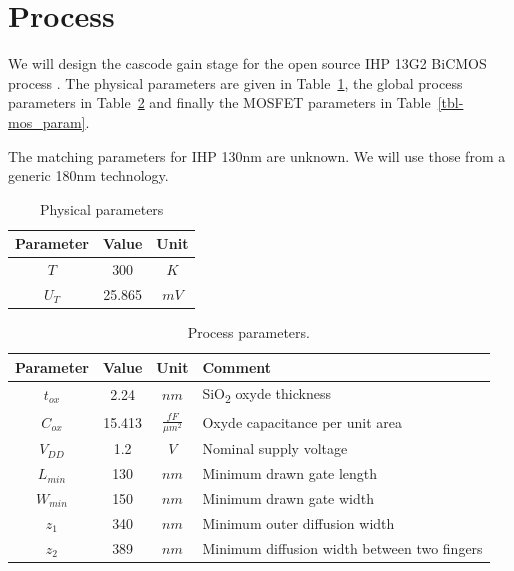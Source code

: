 \documentclass[
  a4paper,
  DIV=11,
  numbers=noendperiod]{scrreprt}
\begin{document}
\section{Process}\label{process}

We will design the cascode gain stage for the open source IHP 13G2
BiCMOS process . The physical
parameters are given in Table~\ref{tbl-physics_param}, the global
process parameters in Table~\ref{tbl-process_param} and finally the
MOSFET parameters in Table~\ref{tbl-mos_param}.

\begin{tcolorbox}[enhanced jigsaw, bottomrule=.15mm, colback=white, leftrule=.75mm, toprule=.15mm, opacitybacktitle=0.6, colbacktitle=quarto-callout-warning-color!10!white, left=2mm, colframe=quarto-callout-warning-color-frame, coltitle=black, bottomtitle=1mm, arc=.35mm, toptitle=1mm, titlerule=0mm, title=\textcolor{quarto-callout-warning-color}{\faExclamationTriangle}\hspace{0.5em}{Warning}, breakable, opacityback=0, rightrule=.15mm]

The matching parameters for IHP 130nm are unknown. We will use those
from a generic 180nm technology.

\end{tcolorbox}

\begin{longtable}[]{@{}ccc@{}}

\caption{\label{tbl-physics_param}Physical parameters}

\tabularnewline

\toprule\noalign{}
Parameter & Value & Unit \\
\midrule\noalign{}
\endhead
\bottomrule\noalign{}
\endlastfoot
\(T\) & 300 & \(K\) \\
\(U_T\) & 25.865 & \(mV\) \\

\end{longtable}

\begin{longtable}[]{@{}cccl@{}}

\caption{\label{tbl-process_param}Process parameters.}

\tabularnewline

\toprule\noalign{}
Parameter & Value & Unit & Comment \\
\midrule\noalign{}
\endhead
\bottomrule\noalign{}
\endlastfoot
\(t_{{ox}}\) & 2.24 & \(nm\) & SiO\textsubscript{2} oxyde thickness \\
\(C_{{ox}}\) & 15.413 & \(\frac{{fF}}{{\mu m^2}}\) & Oxyde capacitance
per unit area \\
\(V_{{DD}}\) & 1.2 & \(V\) & Nominal supply voltage \\
\(L_{{min}}\) & 130 & \(nm\) & Minimum drawn gate length \\
\(W_{{min}}\) & 150 & \(nm\) & Minimum drawn gate width \\
\(z_1\) & 340 & \(nm\) & Minimum outer diffusion width \\
\(z_2\) & 389 & \(nm\) & Minimum diffusion width between two fingers \\

\end{longtable}
\end{document}
